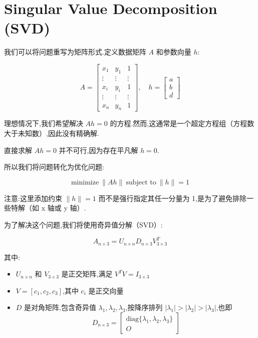 \section{Singular Value Decomposition (SVD)}

我们可以将问题重写为矩阵形式.定义数据矩阵 $A$ 和参数向量 $h$:

$$
A = \begin{bmatrix}
x_1 & y_1 & 1 \\
\vdots & \vdots & \vdots \\
x_i & y_i & 1 \\
\vdots & \vdots & \vdots \\
x_n & y_n & 1
\end{bmatrix}, \quad
h = \begin{bmatrix}
a \\
b \\
d
\end{bmatrix}
$$

理想情况下,我们希望解决 $Ah = 0$ 的方程.然而,这通常是一个超定方程组（方程数大于未知数）,因此没有精确解.

直接求解 $Ah = 0$ 并不可行,因为存在平凡解 $h = 0$.

所以我们将问题转化为优化问题:

\begin{equation}
    \text{minimize} \: \|Ah\| \: \text{subject to} \: \|h\| = 1
\end{equation}

注意:这里添加约束 $\|h\| = 1$ 而不是强行指定其任一分量为 1,是为了避免排除一些特解（如 x 轴或 y 轴）.

为了解决这个问题,我们将使用奇异值分解（SVD）:

$$
A_{n \times 3} = U_{n \times n} D_{n \times 3} V^T_{3 \times 3}
$$

其中:

\begin{itemize}
    \item $U_{n \times n}$ 和 $V_{3 \times 3}$ 是正交矩阵,满足 $V^T V = I_{3 \times 3}$
    \item $V = [c_1, c_2, c_3]$,其中 $c_i$ 是正交向量
    \item $D$ 是对角矩阵,包含奇异值 $\lambda_1, \lambda_2, \lambda_3$,按降序排列 $|\lambda_1| > |\lambda_2| > |\lambda_3|$,也即
    $$
    D_{n \times 3} = \begin{bmatrix}
    \text{diag}\{\lambda_1, \lambda_2, \lambda_3\} \\
    O
    \end{bmatrix}
    $$
\end{itemize}

